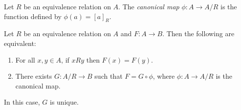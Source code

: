 \begin{definition}
    Let $R$ be an equivalence relation on $A$. The \emph{canonical map} $\phi : A \rightarrow A / R$
    is the function defined by $\phi(a) = [a]_R$.
\end{definition}

\begin{theorem}
    Let $R$ be an equivalence relation on $A$ and $F : A \rightarrow B$.
    Then the following are equivalent:
    \begin{enumerate}
        \item For all $x, y \in A$, if $xRy$ then $F(x) = F(y)$.
        \item There exists $G : A / R \rightarrow B$ such that 
        $F = G \circ \phi$, where $\phi : A \rightarrow A / R$ is the canonical map.
    \end{enumerate}
    In this case, $G$ is unique.
\end{theorem}

